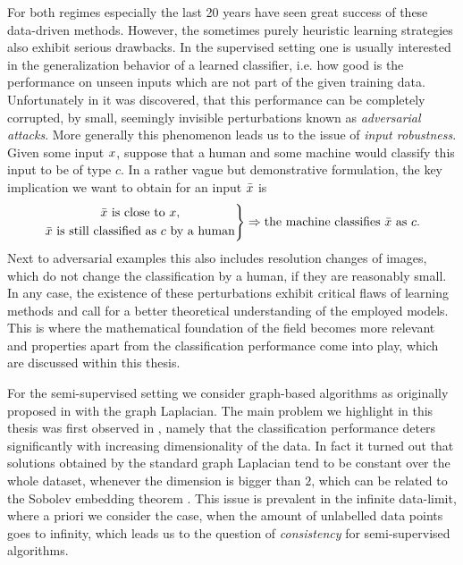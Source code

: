 For both regimes especially the last 20 years have seen great success of these data-driven methods. However, the sometimes purely heuristic learning strategies also exhibit serious drawbacks. In the supervised setting one is usually interested in the generalization behavior of a learned classifier, i.e. how good is the performance on unseen inputs which are not part of the given training data. Unfortunately in \cite{goodfellow2014explaining} it was discovered, that this performance can be completely corrupted, by small, seemingly invisible perturbations known as \textit{adversarial attacks}. More generally this phenomenon leads us to the issue of \textit{input robustness}. Given some input $x$, suppose that a human and some machine would classify this input to be of type $c$. In a rather vague but demonstrative formulation, the key implication we want to obtain for an input $\bar{x}$ is
%
\begin{align*}
\left.
\begin{gathered}
\bar{x}\text{ is close to }x,\\
\bar{x}\text{ is still classified as }c\text{ by a human}
\end{gathered}
\right\}
\Rightarrow
\text{the machine classifies }\bar{x}\text{ as } c. 
\end{align*}
%
Next to adversarial examples this also includes resolution changes of images, which do not change the classification by a human, if they are reasonably small. In any case, the existence of these perturbations exhibit critical flaws of learning methods and call for a better theoretical understanding of the employed models. This is where the mathematical foundation of the field becomes more relevant and properties apart from the classification performance come into play, which are discussed within this thesis.

For the semi-supervised setting we consider graph-based algorithms as originally proposed in \cite{zhu2003semi} with the graph Laplacian. The main problem we highlight in this thesis was first observed in \cite{nadler2009statistical}, namely that the classification performance deters significantly with increasing dimensionality of the data. In fact it turned out that solutions obtained by the standard graph Laplacian tend to be constant over the whole dataset, whenever the dimension is bigger than $2$, which can be related to the Sobolev embedding theorem \cite{adams2003sobolev}. This issue is prevalent in the infinite data-limit, where a priori we consider the case, when the amount of unlabelled data points goes to infinity, which leads us to the question of \textit{consistency} for semi-supervised algorithms.

